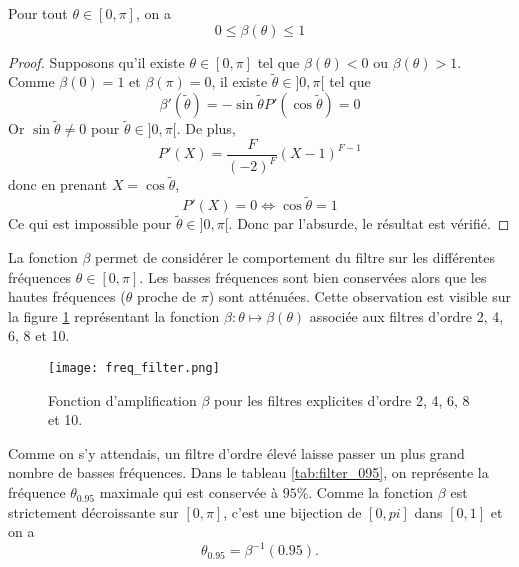 \begin{proposition}
Pour tout $\theta \in [0, \pi]$, on a 
\begin{equation}
0 \leq \beta ( \theta ) \leq 1
\end{equation}
\end{proposition}

\begin{proof}
Supposons qu'il existe $\theta \in [0, \pi]$ tel que $\beta(\theta) < 0$ ou $\beta(\theta) > 1$. Comme $\beta(0)=1$ et $\beta(\pi) = 0$, il existe $\tilde{\theta} \in ]0, \pi[$ tel que 
\begin{equation}
\beta'(\tilde{\theta}) = - \sin \tilde{\theta} P'(\cos \tilde{\theta} ) = 0
\end{equation}
Or $\sin \tilde{\theta} \neq 0$ pour $\tilde{\theta} \in ]0, \pi[$.
De plus, 
\begin{equation}
P'(X) = \dfrac{F}{(-2)^F}(X-1)^{F-1}
\end{equation}
donc en prenant $X = \cos \tilde{\theta}$,
\begin{equation*}
P'(X) = 0 \Leftrightarrow \cos \tilde{\theta} = 1
\end{equation*}
Ce qui est impossible pour $\tilde{\theta} \in ]0, \pi[$. Donc par l'absurde, le résultat est vérifié.
\end{proof}

La fonction $\beta$ permet de considérer le comportement du filtre sur les différentes fréquences $\theta \in [0, \pi]$. Les basses fréquences sont bien conservées alors que les hautes fréquences ($\theta$ proche de $\pi$) sont atténuées. Cette observation est visible sur la figure \ref{fig:freq_filter} représentant la fonction $\beta : \theta \mapsto \beta(\theta)$ associée aux filtres d'ordre 2, 4, 6, 8 et 10. 

\begin{figure}[htbp]
\begin{center}
\texttt{[image: freq\_filter.png]}
\end{center}
\caption{Fonction d'amplification $\beta$ pour les filtres explicites d'ordre 2, 4, 6, 8 et 10.}
\label{fig:freq_filter}
\end{figure}
Comme on s'y attendais, un filtre d'ordre élevé laisse passer un plus grand nombre de basses fréquences. Dans le tableau \ref{tab:filter_095}, on représente la fréquence $\theta_{0.95}$ maximale qui est conservée à $95\%$. Comme la fonction $\beta$ est strictement décroissante sur $[0,\pi]$, c'est une bijection de $[0,pi]$ dans $[0,1]$ et on a 
\begin{equation}
\theta_{0.95} = \beta^{-1}(0.95).
\end{equation}

